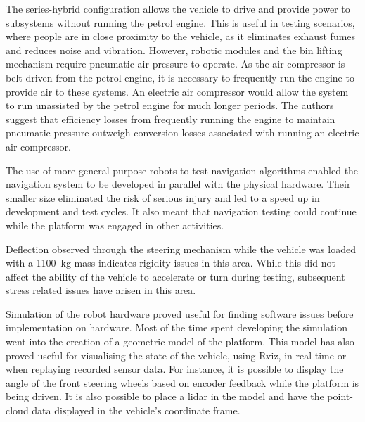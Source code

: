 \documentclass[preprint,authoryear,12pt]{elsarticle}
\begin{document}
    The series-hybrid configuration allows the vehicle to drive and provide power to subsystems without running the petrol engine.
    This is useful in testing scenarios, where people are in close proximity to the vehicle, as it eliminates exhaust fumes and reduces noise and vibration.
    However, robotic modules and the bin lifting mechanism require pneumatic air pressure to operate.
    As the air compressor is belt driven from the petrol engine, it is necessary to frequently run the engine to provide air to these systems.
    An electric air compressor would allow the system to run unassisted by the petrol engine for much longer periods.
    The authors suggest that efficiency losses from frequently running the engine to maintain pneumatic pressure outweigh conversion losses associated with running an electric air compressor.

    The use of more general purpose robots to test navigation algorithms enabled the navigation system to be developed in parallel with the physical hardware.
    Their smaller size eliminated the risk of serious injury and led to a speed up in development and test cycles.
    It also meant that navigation testing could continue while the platform was engaged in other activities.

    Deflection observed through the steering mechanism while the vehicle was loaded with a \SI{1100}{\kilo\gram} mass indicates rigidity issues in this area.
    While this did not affect the ability of the vehicle to accelerate or turn during testing, subsequent stress related issues have arisen in this area.

    Simulation of the robot hardware proved useful for finding software issues before implementation on hardware.
    Most of the time spent developing the simulation went into the creation of a geometric model of the platform.
    This model has also proved useful for visualising the state of the vehicle, using Rviz, in real-time or when replaying recorded sensor data.
    For instance, it is possible to display the angle of the front steering wheels based on encoder feedback while the platform is being driven.
    It is also possible to place a lidar in the model and have the point-cloud data displayed in the vehicle's coordinate frame.
\end{document}
